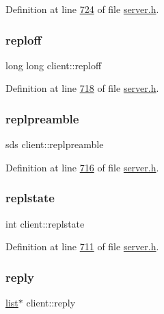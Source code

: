 Definition at line \hyperlink{server_8h_source_l00724}{724} of file \hyperlink{server_8h_source}{server.\+h}.

\mbox{\label{structclient_ab4d6ef175cefe576b0385d103ff2a949}} 
\subsubsection{\texorpdfstring{reploff}{reploff}}
{\footnotesize\ttfamily long long client\+::reploff}



Definition at line \hyperlink{server_8h_source_l00718}{718} of file \hyperlink{server_8h_source}{server.\+h}.

\mbox{\label{structclient_a1ecedfd2fe13d95204235771b03e6b80}} 
\subsubsection{\texorpdfstring{replpreamble}{replpreamble}}
{\footnotesize\ttfamily sds client\+::replpreamble}



Definition at line \hyperlink{server_8h_source_l00716}{716} of file \hyperlink{server_8h_source}{server.\+h}.

\mbox{\label{structclient_a5fca43e8a0ac8735c73ba54af36723ea}} 
\subsubsection{\texorpdfstring{replstate}{replstate}}
{\footnotesize\ttfamily int client\+::replstate}



Definition at line \hyperlink{server_8h_source_l00711}{711} of file \hyperlink{server_8h_source}{server.\+h}.

\mbox{\label{structclient_a76aa9a5fa3b50b5498082076d864a527}} 
\subsubsection{\texorpdfstring{reply}{reply}}
{\footnotesize\ttfamily \hyperlink{structlist}{list}$\ast$ client\+::reply}



